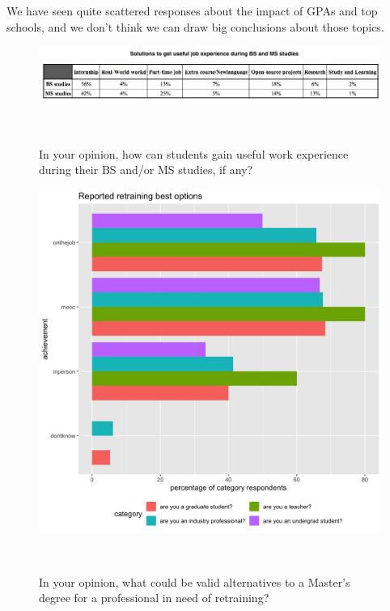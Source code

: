 \documentclass{sigchi}
\begin{document}
We have seen quite scattered responses about the impact of GPAs and top schools, and we don't think we can draw big conclusions about those topics.

\begin{figure}
  \centering
  \includegraphics[width=1.75\columnwidth]{../data-analysis/plots_output/Solutions_to_gain_useful_job_experience.png}
  \caption{In your opinion, how can students gain useful work experience during their BS and/or MS studies, if any?}~\label{fig:figure12}
\end{figure}

\begin{figure}
  \includegraphics[scale=0.2]{../data-analysis/plots_output/Reported_retraining_best_options.png}
  \caption{In your opinion, what could be valid alternatives to a Master's degree for a professional in need of retraining?}~\label{fig:figure13}
\end{figure}
\end{document}
